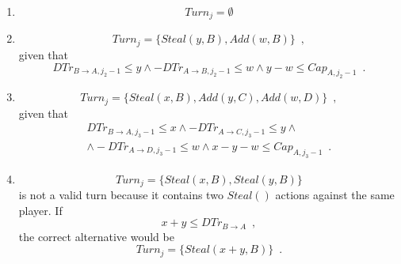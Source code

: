 \documentclass[11pt]{llncs}
\begin{document}
     \begin{enumerate}
        \item \begin{equation}
           Turn_j = \emptyset
        \end{equation}
        \item \begin{equation}
           Turn_j = \{Steal\left(y, B\right), Add\left(w, B\right)\} \enspace,
        \end{equation}
        given that
        \begin{equation}
           DTr_{B \rightarrow A, j_2 - 1} \leq y \wedge -DTr_{A \rightarrow B, j_2 - 1} \leq w \wedge y - w \leq
           Cap_{A, j_2-1} \enspace.
        \end{equation}
        \item \begin{equation}
           Turn_j = \{Steal\left(x, B\right), Add\left(y, C\right), Add\left(w, D\right)\} \enspace,
        \end{equation}
        given that
        \begin{equation}
        \begin{gathered}
           DTr_{B \rightarrow A, j_3 - 1} \leq x \wedge -DTr_{A \rightarrow C, j_3-1} \leq y \wedge \\
           \wedge -DTr_{A \rightarrow D, j_3 - 1} \leq w \wedge x - y - w \leq Cap_{A, j_3-1} \enspace.
        \end{gathered}
        \end{equation}
        \item \begin{equation}
           Turn_j = \{Steal\left(x, B\right), Steal\left(y, B\right)\}
        \end{equation}
        is not a valid turn because it contains two $Steal\left(\right)$ actions against the same player. If
        \begin{equation}
           x + y \leq DTr_{B \rightarrow A} \enspace,
        \end{equation}
        the correct alternative would be
        \begin{equation}
           Turn_j = \{Steal\left(x+y, B\right)\} \enspace.
        \end{equation}
     \end{enumerate}
\end{document}
